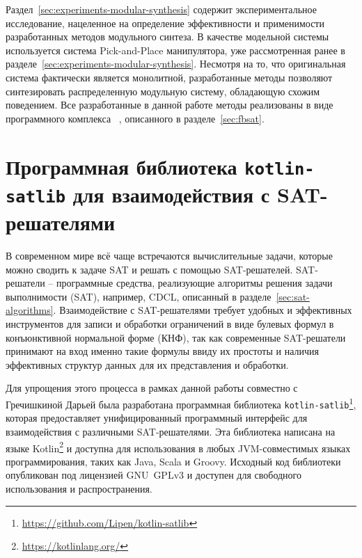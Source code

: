 Раздел~\ref{sec:experiments-modular-synthesis} содержит экспериментальное исследование, нацеленное на определение эффективности и применимости разработанных методов модульного синтеза.
В качестве модельной системы используется система Pick-and-Place манипулятора, уже рассмотренная ранее в разделе~\ref{sec:experiments-modular-synthesis}.
Несмотря на то, что оригинальная система фактически является монолитной, разработанные методы позволяют синтезировать распределенную модульную систему, обладающую схожим поведением.
Все разработанные в данной работе методы реализованы в виде программного комплекса ~\cite{fbSAT-tool}, описанного в разделе~\ref{sec:fbsat}.


\section{Программная библиотека \texttt{kotlin-satlib} для взаимодействия с SAT-решателями}
\label{sec:kotlin-satlib}

В современном мире всё чаще встречаются вычислительные задачи, которые можно сводить к задаче SAT и решать с помощью SAT-решателей.
SAT-решатели \--- программные средства, реализующие алгоритмы решения задачи выполнимости (SAT), например, CDCL, описанный в разделе~\ref{sec:sat-algorithms}.
Взаимодействие с SAT-решателями требует удобных и эффективных инструментов для записи и обработки ограничений в виде булевых формул в конъюнктивной нормальной форме (КНФ), так как современные SAT-решатели принимают на вход именно такие формулы ввиду их простоты и наличия эффективных структур данных для их представления и обработки.

Для упрощения этого процесса в рамках данной работы совместно с Гречишкиной Дарьей была разработана программная библиотека \texttt{kotlin-satlib}\footnote{\url{https://github.com/Lipen/kotlin-satlib}}, которая предоставляет унифицированный программный интерфейс для взаимодействия с различными SAT-решателями.
Эта библиотека написана на языке Kotlin\footnote{\url{https://kotlinlang.org/}} и доступна для использования в любых JVM-совместимых языках программирования, таких как Java, Scala и Groovy.
Исходный код библиотеки опубликован под лицензией GNU~GPLv3 и доступен для свободного использования и распространения.

